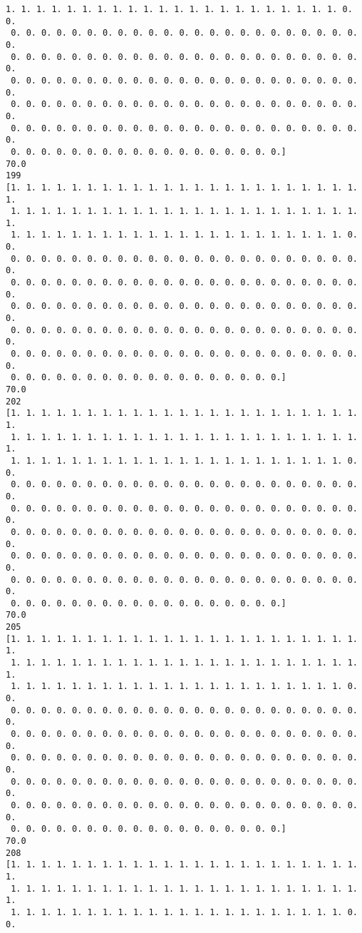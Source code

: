\documentclass[11pt]{article}
\begin{document}
\begin{Verbatim}[commandchars=\\\{\}]
 1. 1. 1. 1. 1. 1. 1. 1. 1. 1. 1. 1. 1. 1. 1. 1. 1. 1. 1. 1. 1. 1. 0. 0.
 0. 0. 0. 0. 0. 0. 0. 0. 0. 0. 0. 0. 0. 0. 0. 0. 0. 0. 0. 0. 0. 0. 0. 0.
 0. 0. 0. 0. 0. 0. 0. 0. 0. 0. 0. 0. 0. 0. 0. 0. 0. 0. 0. 0. 0. 0. 0. 0.
 0. 0. 0. 0. 0. 0. 0. 0. 0. 0. 0. 0. 0. 0. 0. 0. 0. 0. 0. 0. 0. 0. 0. 0.
 0. 0. 0. 0. 0. 0. 0. 0. 0. 0. 0. 0. 0. 0. 0. 0. 0. 0. 0. 0. 0. 0. 0. 0.
 0. 0. 0. 0. 0. 0. 0. 0. 0. 0. 0. 0. 0. 0. 0. 0. 0. 0. 0. 0. 0. 0. 0. 0.
 0. 0. 0. 0. 0. 0. 0. 0. 0. 0. 0. 0. 0. 0. 0. 0. 0. 0.]
70.0
199
[1. 1. 1. 1. 1. 1. 1. 1. 1. 1. 1. 1. 1. 1. 1. 1. 1. 1. 1. 1. 1. 1. 1. 1.
 1. 1. 1. 1. 1. 1. 1. 1. 1. 1. 1. 1. 1. 1. 1. 1. 1. 1. 1. 1. 1. 1. 1. 1.
 1. 1. 1. 1. 1. 1. 1. 1. 1. 1. 1. 1. 1. 1. 1. 1. 1. 1. 1. 1. 1. 1. 0. 0.
 0. 0. 0. 0. 0. 0. 0. 0. 0. 0. 0. 0. 0. 0. 0. 0. 0. 0. 0. 0. 0. 0. 0. 0.
 0. 0. 0. 0. 0. 0. 0. 0. 0. 0. 0. 0. 0. 0. 0. 0. 0. 0. 0. 0. 0. 0. 0. 0.
 0. 0. 0. 0. 0. 0. 0. 0. 0. 0. 0. 0. 0. 0. 0. 0. 0. 0. 0. 0. 0. 0. 0. 0.
 0. 0. 0. 0. 0. 0. 0. 0. 0. 0. 0. 0. 0. 0. 0. 0. 0. 0. 0. 0. 0. 0. 0. 0.
 0. 0. 0. 0. 0. 0. 0. 0. 0. 0. 0. 0. 0. 0. 0. 0. 0. 0. 0. 0. 0. 0. 0. 0.
 0. 0. 0. 0. 0. 0. 0. 0. 0. 0. 0. 0. 0. 0. 0. 0. 0. 0.]
70.0
202
[1. 1. 1. 1. 1. 1. 1. 1. 1. 1. 1. 1. 1. 1. 1. 1. 1. 1. 1. 1. 1. 1. 1. 1.
 1. 1. 1. 1. 1. 1. 1. 1. 1. 1. 1. 1. 1. 1. 1. 1. 1. 1. 1. 1. 1. 1. 1. 1.
 1. 1. 1. 1. 1. 1. 1. 1. 1. 1. 1. 1. 1. 1. 1. 1. 1. 1. 1. 1. 1. 1. 0. 0.
 0. 0. 0. 0. 0. 0. 0. 0. 0. 0. 0. 0. 0. 0. 0. 0. 0. 0. 0. 0. 0. 0. 0. 0.
 0. 0. 0. 0. 0. 0. 0. 0. 0. 0. 0. 0. 0. 0. 0. 0. 0. 0. 0. 0. 0. 0. 0. 0.
 0. 0. 0. 0. 0. 0. 0. 0. 0. 0. 0. 0. 0. 0. 0. 0. 0. 0. 0. 0. 0. 0. 0. 0.
 0. 0. 0. 0. 0. 0. 0. 0. 0. 0. 0. 0. 0. 0. 0. 0. 0. 0. 0. 0. 0. 0. 0. 0.
 0. 0. 0. 0. 0. 0. 0. 0. 0. 0. 0. 0. 0. 0. 0. 0. 0. 0. 0. 0. 0. 0. 0. 0.
 0. 0. 0. 0. 0. 0. 0. 0. 0. 0. 0. 0. 0. 0. 0. 0. 0. 0.]
70.0
205
[1. 1. 1. 1. 1. 1. 1. 1. 1. 1. 1. 1. 1. 1. 1. 1. 1. 1. 1. 1. 1. 1. 1. 1.
 1. 1. 1. 1. 1. 1. 1. 1. 1. 1. 1. 1. 1. 1. 1. 1. 1. 1. 1. 1. 1. 1. 1. 1.
 1. 1. 1. 1. 1. 1. 1. 1. 1. 1. 1. 1. 1. 1. 1. 1. 1. 1. 1. 1. 1. 1. 0. 0.
 0. 0. 0. 0. 0. 0. 0. 0. 0. 0. 0. 0. 0. 0. 0. 0. 0. 0. 0. 0. 0. 0. 0. 0.
 0. 0. 0. 0. 0. 0. 0. 0. 0. 0. 0. 0. 0. 0. 0. 0. 0. 0. 0. 0. 0. 0. 0. 0.
 0. 0. 0. 0. 0. 0. 0. 0. 0. 0. 0. 0. 0. 0. 0. 0. 0. 0. 0. 0. 0. 0. 0. 0.
 0. 0. 0. 0. 0. 0. 0. 0. 0. 0. 0. 0. 0. 0. 0. 0. 0. 0. 0. 0. 0. 0. 0. 0.
 0. 0. 0. 0. 0. 0. 0. 0. 0. 0. 0. 0. 0. 0. 0. 0. 0. 0. 0. 0. 0. 0. 0. 0.
 0. 0. 0. 0. 0. 0. 0. 0. 0. 0. 0. 0. 0. 0. 0. 0. 0. 0.]
70.0
208
[1. 1. 1. 1. 1. 1. 1. 1. 1. 1. 1. 1. 1. 1. 1. 1. 1. 1. 1. 1. 1. 1. 1. 1.
 1. 1. 1. 1. 1. 1. 1. 1. 1. 1. 1. 1. 1. 1. 1. 1. 1. 1. 1. 1. 1. 1. 1. 1.
 1. 1. 1. 1. 1. 1. 1. 1. 1. 1. 1. 1. 1. 1. 1. 1. 1. 1. 1. 1. 1. 1. 0. 0.

\end{Verbatim}
\end{document}
